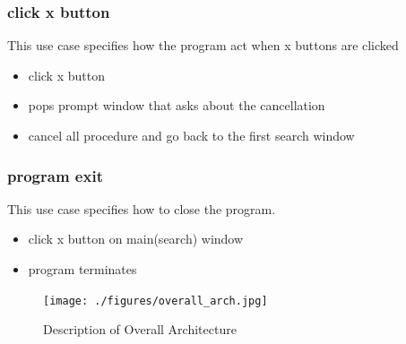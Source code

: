 \documentclass[conference]{IEEEtran}
\begin{document}
\subsubsection{click x button}
This use case specifies how the program act when x buttons are clicked
\begin{itemize}
  \item click x button
  \item pops prompt window that asks about the cancellation
  \item cancel all procedure and go back to the first search window
\end{itemize}
\textit{}



\subsubsection{program exit}
This use case specifies how to close the program.
\begin{itemize}
  \item click x button on main(search) window
  \item program terminates
\end{itemize}
\textit{}




\begin{figure}
\centering
\texttt{[image: ./figures/overall\_arch.jpg]}
\caption{Description of Overall Architecture}
\label{overall}
\end{figure}









\end{document}
